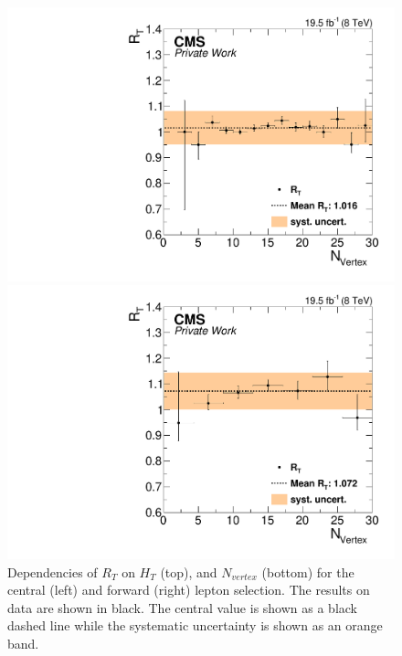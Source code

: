 \begin{figure}[htbp]
\begin{minipage}[t]{0.49\textwidth}
  \includegraphics[width=\textwidth]{plots/BG/trigger/Triggereff_SFvsOF_Syst_AlphaT_HighHTExclusiveCentral_Full2012_nVtx_None.pdf}
\end{minipage}
\begin{minipage}[t]{0.49\textwidth}
\includegraphics[width=\textwidth]{plots/BG/trigger/Triggereff_SFvsOF_Syst_AlphaT_HighHTExclusiveForward_Full2012_nVtx_None.pdf}
\end{minipage}
\caption{Dependencies of $R_T$ on $H_T$ (top), and $N_{vertex}$ (bottom) for the central (left) and forward (right) lepton selection. The results on data are shown in black. The central value is shown as a black dashed line while the systematic uncertainty is shown as an orange band.}
\label{fig:RTDependenciesApp2}
\end{figure}  
